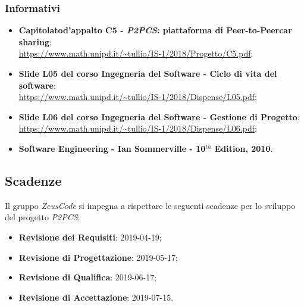\subsubsection{Informativi}
\begin{itemize}
	\item \textbf{Capitolato\glosp d'appalto C5 - \textit{P2PCS}: piattaforma di Peer-to-Peer\glosp car sharing}: \\
	\url{https://www.math.unipd.it/~tullio/IS-1/2018/Progetto/C5.pdf};
	\item \textbf{Slide L05 del corso Ingegneria del Software - Ciclo di vita 
		del software}:\\
	\url{https://www.math.unipd.it/~tullio/IS-1/2018/Dispense/L05.pdf};
	\item \textbf{Slide L06 del corso Ingegneria del Software - Gestione di 
	Progetto}: \\
	\url{https://www.math.unipd.it/~tullio/IS-1/2018/Dispense/L06.pdf};
	\item \textbf{Software Engineering - Ian Sommerville - 10$^{th}$ Edition, 
	2010}.
\end{itemize}

\hypertarget{scadenze}{\subsection{Scadenze}}
Il gruppo \textit{ZeusCode} si impegna a rispettare le seguenti scadenze per lo 
sviluppo del progetto \textit{P2PCS}:

\begin{itemize}
	\item \textbf{Revisione dei Requisiti}: 2019-04-19;
	\item \textbf{Revisione di Progettazione}: 2019-05-17;
	\item \textbf{Revisione di Qualifica}: 2019-06-17;
	\item \textbf{Revisione di Accettazione}: 2019-07-15.
\end{itemize}